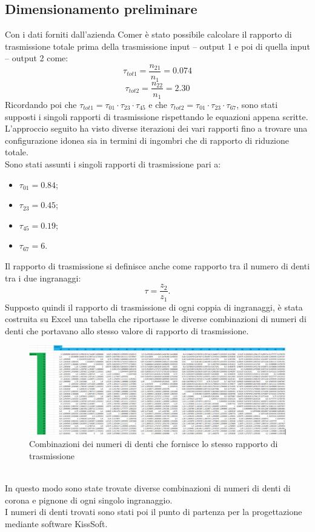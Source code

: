 \subsection{Dimensionamento preliminare}
Con i dati forniti dall’azienda Comer è stato possibile calcolare il rapporto di trasmissione totale prima della trasmissione input – output 1 e poi di quella input – output 2 come: 
\begin{equation}
    \tau_{tot1}=\frac{n_{21}}{n_1}=0.074
\end{equation}
\begin{equation}
        \tau_{tot2}=\frac{n_{22}}{n_1}=2.30
\end{equation}
Ricordando poi che $\tau_{tot1}=\tau_{01}\cdot\tau_{23}\cdot\tau_{45}$ e che $\tau_{tot2}=\tau_{01}\cdot\tau_{23}\cdot\tau_{67}$, sono stati supposti i singoli rapporti di trasmissione rispettando le equazioni appena scritte. \\
L'approccio seguito ha visto diverse iterazioni dei vari rapporti fino a trovare una configurazione idonea sia in termini di ingombri che di rapporto di riduzione totale.\\
Sono stati assunti i singoli rapporti di trasmissione pari a: 
\begin{itemize}
    \item $\tau_{01}=0.84$;
    \item $\tau_{23}=0.45$;
    \item $\tau_{45}=0.19$;
    \item $\tau_{67}=6$.
\end{itemize}
Il rapporto di trasmissione si definisce anche come rapporto tra il numero di denti tra i due ingranaggi:
\begin{equation}
    \tau=\frac{z_2}{z_1}.
\end{equation}
Supposto quindi il rapporto di trasmissione di ogni coppia di ingranaggi, è stata costruita su Excel una tabella che riportasse le diverse combinazioni di numeri di denti che portavano allo stesso valore di rapporto di trasmissione. 
\begin{figure}[h]
    \centering
    \includegraphics[scale=0.5]{Immagini/Excel.png}
    \caption{Combinazioni dei numeri di denti che fornisce lo stesso rapporto di trasmissione}
    \label{fig:Excel}
\end{figure}
\\
In questo modo sono state trovate diverse combinazioni di numeri di denti di corona e pignone di ogni singolo ingranaggio.\\
I numeri di denti trovati sono stati poi il punto di partenza per la progettazione mediante software KissSoft. 
